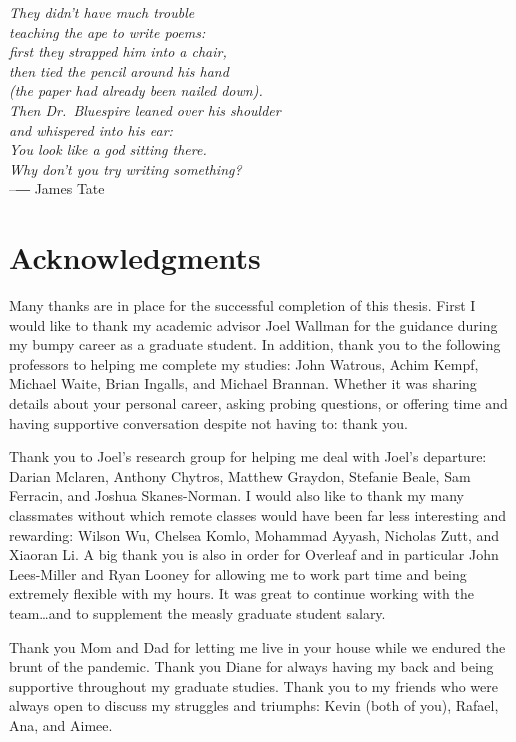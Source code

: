 
\begin{flushright}{\slshape
        They didn't have much trouble \\
        teaching the ape to write poems: \\
        first they strapped him into a chair, \\
        then tied the pencil around his hand \\
        (the paper had already been nailed down). \\
        Then Dr.\ Bluespire leaned over his shoulder \\
        and whispered into his ear: \\
        You look like a god sitting there. \\
        Why don't you try writing something?} \\ \medskip
    --― James Tate
\end{flushright}

\bigskip

\begingroup
\let\clearpage\relax
\let\cleardoublepage\relax
\let\cleardoublepage\relax

\chapter*{Acknowledgments}

Many thanks are in place for the successful completion of this thesis.
First I would like to thank my academic advisor Joel Wallman for the guidance during my bumpy career as a graduate student.
In addition, thank you to the following professors to helping me complete my studies: John Watrous, Achim Kempf, Michael Waite, Brian Ingalls, and Michael Brannan.
Whether it was sharing details about your personal career, asking probing questions, or offering time and having supportive conversation despite not having to: thank you.

Thank you to Joel's research group for helping me deal with Joel's departure: Darian Mclaren, Anthony Chytros, Matthew Graydon, Stefanie Beale, Sam Ferracin, and Joshua Skanes-Norman.
I would also like to thank my many classmates without which remote classes would have been far less interesting and rewarding: Wilson Wu, Chelsea Komlo, Mohammad Ayyash, Nicholas Zutt, and Xiaoran Li.
A big thank you is also in order for Overleaf and in particular John Lees-Miller and Ryan Looney for allowing me to work part time and being extremely flexible with my hours.
It was great to continue working with the team\dots and to supplement the measly graduate student salary.

Thank you Mom and Dad for letting me live in your house while we endured the brunt of the pandemic.
Thank you Diane for always having my back and being supportive throughout my graduate studies.
Thank you to my friends who were always open to discuss my struggles and triumphs: Kevin (both of you), Rafael, Ana, and Aimee.

\endgroup
